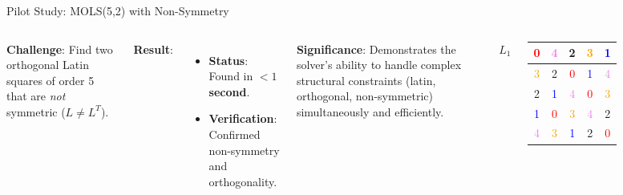 \documentclass[10pt, aspectratio=169]{beamer}
\begin{document}
\begin{frame}{Pilot Study: MOLS(5,2) with Non-Symmetry}
    \begin{columns}
        \textbf{Challenge}: Find two orthogonal Latin squares of order 5 that are \textit{not} symmetric ($L \neq L^T$).
        
        \vspace{0.2cm}
        \textbf{Result}:
        \begin{itemize}
            \item \textbf{Status}: Found in \textbf{$< 1$ second}.
            \item \textbf{Verification}: Confirmed non-symmetry and orthogonality.
        \end{itemize}
        
        \vspace{0.2cm}
        \textbf{Significance}:
        Demonstrates the solver's ability to handle complex structural constraints (latin, orthogonal, non-symmetric) simultaneously and efficiently.

        \centering
        \footnotesize
        \textbf{$L_1$} \quad
        \begin{tabular}{|c|c|c|c|c|}
        \hline
         \textcolor{red}{0} & \textcolor{violet}{4} & \textcolor{green!60!black}{2} & \textcolor{orange}{3} & \textcolor{blue}{1} \\ \hline
         \textcolor{orange}{3} & \textcolor{green!60!black}{2} & \textcolor{red}{0} & \textcolor{blue}{1} & \textcolor{violet}{4} \\ \hline
         \textcolor{green!60!black}{2} & \textcolor{blue}{1} & \textcolor{violet}{4} & \textcolor{red}{0} & \textcolor{orange}{3} \\ \hline
         \textcolor{blue}{1} & \textcolor{red}{0} & \textcolor{orange}{3} & \textcolor{violet}{4} & \textcolor{green!60!black}{2} \\ \hline
         \textcolor{violet}{4} & \textcolor{orange}{3} & \textcolor{blue}{1} & \textcolor{green!60!black}{2} & \textcolor{red}{0} \\ \hline
        \end{tabular}


\end{columns}
\end{frame}
\end{document}
